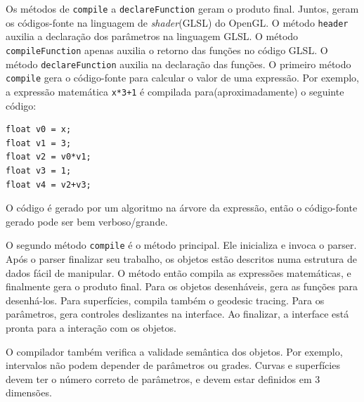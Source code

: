 Os métodos de \texttt{compile} a \texttt{declareFunction} geram o produto final.
Juntos, geram os códigos-fonte na linguagem de \textit{shader}(GLSL) do OpenGL.
O método \texttt{header} auxilia a declaração dos parâmetros na linguagem GLSL.
O método \texttt{compileFunction} apenas auxilia o retorno das funções no código GLSL.
O método \texttt{declareFunction} auxilia na declaração das funções.
O primeiro método \texttt{compile} gera o código-fonte para calcular o valor de uma
expressão.
Por exemplo, a expressão matemática \texttt{x*3+1} é
compilada para(aproximadamente) o seguinte código:

\begin{lstlisting}
float v0 = x;
float v1 = 3;
float v2 = v0*v1;
float v3 = 1;
float v4 = v2+v3;
\end{lstlisting}

O código é gerado por um algoritmo na árvore da expressão,
então o código-fonte gerado pode ser bem verboso/grande.

O segundo método \texttt{compile} é o método principal.
Ele inicializa e invoca o parser.
Após o parser finalizar seu trabalho, os objetos estão descritos
numa estrutura de dados fácil de manipular.
O método então compila as expressões matemáticas, e finalmente gera o produto final.
Para os objetos desenháveis, gera as funções para desenhá-los.
Para superfícies, compila também o geodesic tracing.
Para os parâmetros, gera controles deslizantes na interface.
Ao finalizar, a interface está pronta para a interação com os objetos.

O compilador também verifica a validade semântica dos objetos.
Por exemplo, intervalos não podem depender de parâmetros ou grades.
Curvas e superfícies devem ter o número correto de parâmetros, e devem estar
definidos em 3 dimensões.